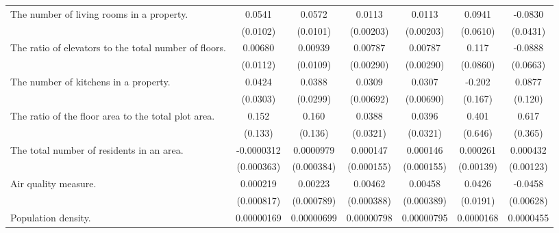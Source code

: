 {\begin{tabular}{l*{6}{c}}
\addlinespace
The number of living rooms in a property.&      0.0541\sym{***}&      0.0572\sym{***}&      0.0113\sym{***}&      0.0113\sym{***}&      0.0941         &     -0.0830\sym{*}  \\
                    &    (0.0102)         &    (0.0101)         &   (0.00203)         &   (0.00203)         &    (0.0610)         &    (0.0431)         \\
\addlinespace
The ratio of elevators to the total number of floors.&     0.00680         &     0.00939         &     0.00787\sym{***}&     0.00787\sym{***}&       0.117         &     -0.0888         \\
                    &    (0.0112)         &    (0.0109)         &   (0.00290)         &   (0.00290)         &    (0.0860)         &    (0.0663)         \\
\addlinespace
The number of kitchens in a property.&      0.0424         &      0.0388         &      0.0309\sym{***}&      0.0307\sym{***}&      -0.202         &      0.0877         \\
                    &    (0.0303)         &    (0.0299)         &   (0.00692)         &   (0.00690)         &     (0.167)         &     (0.120)         \\
\addlinespace
The ratio of the floor area to the total plot area.&       0.152         &       0.160         &      0.0388         &      0.0396         &       0.401         &       0.617\sym{*}  \\
                    &     (0.133)         &     (0.136)         &    (0.0321)         &    (0.0321)         &     (0.646)         &     (0.365)         \\
\addlinespace
The total number of residents in an area.&  -0.0000312         &   0.0000979         &    0.000147         &    0.000146         &    0.000261         &    0.000432         \\
                    &  (0.000363)         &  (0.000384)         &  (0.000155)         &  (0.000155)         &   (0.00139)         &   (0.00123)         \\
\addlinespace
Air quality measure.&    0.000219         &     0.00223\sym{***}&     0.00462\sym{***}&     0.00458\sym{***}&      0.0426\sym{**} &     -0.0458\sym{***}\\
                    &  (0.000817)         &  (0.000789)         &  (0.000388)         &  (0.000389)         &    (0.0191)         &   (0.00628)         \\
\addlinespace
Population density. &  0.00000169         &  0.00000699         &  0.00000798\sym{***}&  0.00000795\sym{***}&   0.0000168         &   0.0000455\sym{**} \\

\end{tabular}}
